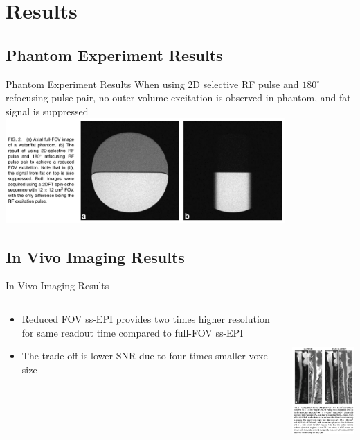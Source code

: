 \documentclass{beamer}
\begin{document}
\section{Results}
\subsection{Phantom Experiment Results}

\begin{frame}{Phantom Experiment Results}
	When using 2D selective RF pulse and $180^{\circ}$ refocusing pulse pair, no outer volume excitation is observed in phantom, and fat signal is suppressed
	\includegraphics[height=4cm]{SpineDWIfig2}
\end{frame}

\subsection{In Vivo Imaging Results}

\begin{frame}{In Vivo Imaging Results}
\begin{columns}[T]
	\begin{column}[T]{5cm}
		\begin{itemize}
			\item Reduced FOV ss-EPI provides two times higher resolution for same readout time compared to full-FOV ss-EPI
			\item The trade-off is lower SNR due to four times smaller voxel size
		\end{itemize}
	\end{column}
	\begin{column}[T]{5cm}
		\includegraphics[height=6cm]{SpineDWIfig3}
	\end{column}
\end{columns}
\end{frame}
\end{document}
